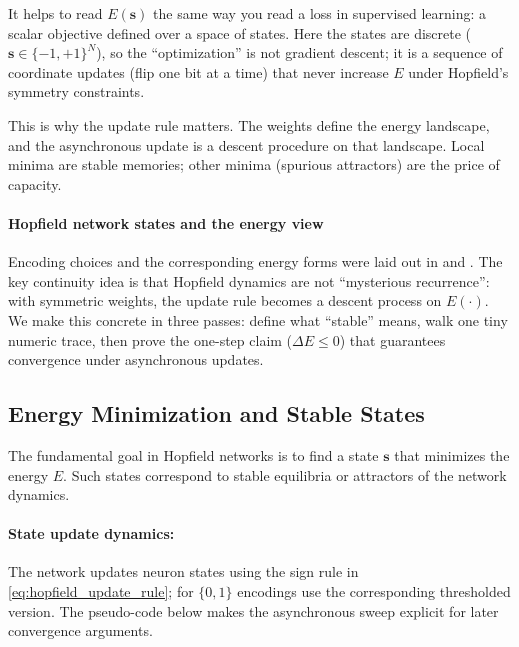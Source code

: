 \begin{tcolorbox}[summarybox, title={Engineering lens: energy as an objective (not a metaphor)}]
It helps to read \(E(\mathbf{s})\) the same way you read a loss in supervised learning: a scalar objective defined over a space of states. Here the states are discrete (\(\mathbf{s}\in\{-1,+1\}^N\)), so the ``optimization'' is not gradient descent; it is a sequence of coordinate updates (flip one bit at a time) that never increase \(E\) under Hopfield's symmetry constraints.

This is why the update rule matters. The weights define the energy landscape, and the asynchronous update is a descent procedure on that landscape. Local minima are stable memories; other minima (spurious attractors) are the price of capacity.
\end{tcolorbox}

\paragraph{Hopfield network states and the energy view}
\label{sec:hopfield_hopfield_network_states_and_energy_function}

Encoding choices and the corresponding energy forms were laid out in  and . The key continuity idea is that Hopfield dynamics are not ``mysterious recurrence'': with symmetric weights, the update rule becomes a descent process on \(E(\cdot)\). We make this concrete in three passes: define what ``stable'' means, walk one tiny numeric trace, then prove the one-step claim (\(\Delta E\le 0\)) that guarantees convergence under asynchronous updates.

\subsection{Energy Minimization and Stable States}
\label{sec:hopfield_energy_minimization_and_stable_states}

The fundamental goal in Hopfield networks is to find a state \(\mathbf{s}\) that minimizes the energy \(E\). Such states correspond to stable equilibria or attractors of the network dynamics.

\paragraph{State update dynamics:}
The network updates neuron states using the sign rule in \eqref{eq:hopfield_update_rule}; for \(\{0,1\}\) encodings use the corresponding thresholded version. The pseudo-code below makes the asynchronous sweep explicit for later convergence arguments.


